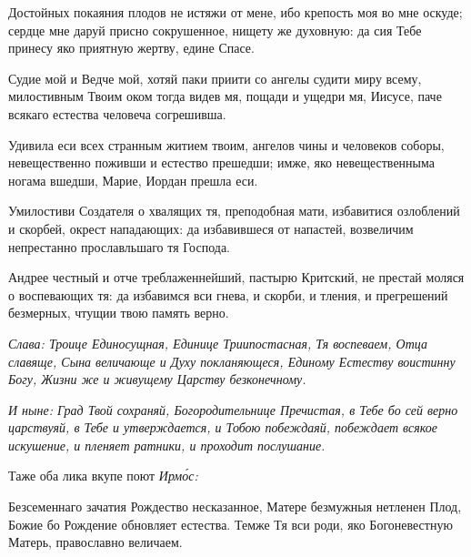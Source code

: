 Достойных покаяния плодов не истяжи от мене, ибо крепость моя во мне оскуде; сердце мне даруй присно сокрушенное, нищету же духовную: да сия Тебе принесу яко приятную жертву, едине Спасе.

Судие мой и Ведче мой, хотяй паки приити со ангелы судити миру всему, милостивным Твоим оком тогда видев мя, пощади и ущедри мя, Иисусе, паче всякаго естества человеча согрешивша.


Удивила еси всех странным житием твоим, ангелов чины и человеков соборы, невещественно поживши и естество прешедши; имже, яко невещественныма ногама вшедши, Марие, Иордан прешла еси.


Умилостиви Создателя о хвалящих тя, преподобная мати, избавитися озлоблений и скорбей, окрест нападающих: да избавившеся от напастей, возвеличим непрестанно прославльшаго тя Господа.


Андрее честный и отче треблаженнейший, пастырю Критский, не престай моляся о воспевающих тя: да избавимся вси гнева, и скорби, и тления, и прегрешений безмерных, чтущии твою память верно.

\itshape Слава\normalfont{}: Троице Единосущная, Единице Триипостасная, Тя воспеваем, Отца славяще, Сына величающе и Духу покланяющеся, Единому Естеству воистинну Богу, Жизни же и живущему Царству безконечному.

\itshape И ныне\normalfont{}: Град Твой сохраняй, Богородительнице Пречистая, в Тебе бо сей верно царствуяй, в Тебе и утверждается, и Тобою побеждаяй, побеждает всякое искушение, и пленяет ратники, и проходит послушание.

Таже оба лика вкупе поют \itshape Ирм\'{о}с\normalfont{}:

Безсеменнаго зачатия Рождество несказанное, Матере безмужныя нетленен Плод, Божие бо Рождение обновляет естества. Темже Тя вси роди, яко Богоневестную Матерь, православно величаем.\mychapterending
